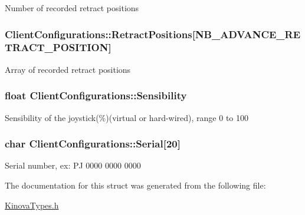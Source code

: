 Number of recorded retract positions \hypertarget{struct_client_configurations_aaebc19d45af665f9db9322d74021ec22}{
\subsubsection[{Retract\-Positions}]{ Client\-Configurations\-::\-Retract\-Positions\mbox{[}{\bf N\-B\-\_\-\-A\-D\-V\-A\-N\-C\-E\-\_\-\-R\-E\-T\-R\-A\-C\-T\-\_\-\-P\-O\-S\-I\-T\-I\-O\-N}\mbox{]}}}\label{struct_client_configurations_aaebc19d45af665f9db9322d74021ec22}
Array of recorded retract positions \hypertarget{struct_client_configurations_a64e61dc032b95f127cd798a9759818d8}{
\subsubsection[{Sensibility}]{\setlength{\rightskip}{0pt plus 5cm}float Client\-Configurations\-::\-Sensibility}}\label{struct_client_configurations_a64e61dc032b95f127cd798a9759818d8}
Sensibility of the joystick(\%)(virtual or hard-\/wired), range 0 to 100 \hypertarget{struct_client_configurations_ae8b80eeae05a07973875ff48a40cf8b4}{
\subsubsection[{Serial}]{\setlength{\rightskip}{0pt plus 5cm}char Client\-Configurations\-::\-Serial\mbox{[}20\mbox{]}}}\label{struct_client_configurations_ae8b80eeae05a07973875ff48a40cf8b4}
Serial number, ex\-: P\-J 0000 0000 0000 

The documentation for this struct was generated from the following file\-:\begin{DoxyCompactItemize}
\item 
\hyperlink{_kinova_types_8h}{Kinova\-Types.\-h}\end{DoxyCompactItemize}
